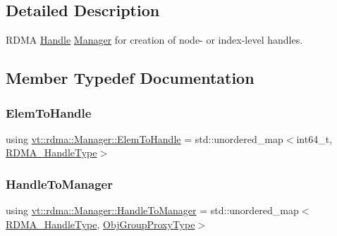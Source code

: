 \subsection{Detailed Description}
R\+D\+MA \hyperlink{structvt_1_1rdma_1_1_handle}{Handle} \hyperlink{structvt_1_1rdma_1_1_manager}{Manager} for creation of node-\/ or index-\/level handles. 

\subsection{Member Typedef Documentation}
\mbox{\label{structvt_1_1rdma_1_1_manager_ad794893058cec7595bc2bcb466ce7d3f}} 
\subsubsection{\texorpdfstring{Elem\+To\+Handle}{ElemToHandle}}
{\footnotesize\ttfamily using \hyperlink{structvt_1_1rdma_1_1_manager_ad794893058cec7595bc2bcb466ce7d3f}{vt\+::rdma\+::\+Manager\+::\+Elem\+To\+Handle} =  std\+::unordered\+\_\+map$<$int64\+\_\+t, \hyperlink{namespacevt_a10442579ec4e7ebef223818e64bcf908}{R\+D\+M\+A\+\_\+\+Handle\+Type}$>$}

\mbox{\label{structvt_1_1rdma_1_1_manager_aac6e7c58d320c302ea08461941d65f6e}} 
\subsubsection{\texorpdfstring{Handle\+To\+Manager}{HandleToManager}}
{\footnotesize\ttfamily using \hyperlink{structvt_1_1rdma_1_1_manager_aac6e7c58d320c302ea08461941d65f6e}{vt\+::rdma\+::\+Manager\+::\+Handle\+To\+Manager} =  std\+::unordered\+\_\+map$<$\hyperlink{namespacevt_a10442579ec4e7ebef223818e64bcf908}{R\+D\+M\+A\+\_\+\+Handle\+Type}, \hyperlink{namespacevt_ad7cae989df485fccca57f0792a880a8e}{Obj\+Group\+Proxy\+Type}$>$}

\mbox{\label{structvt_1_1rdma_1_1_manager_a75d5cdc6428ea19f5ec665b04dcd7166}} 
